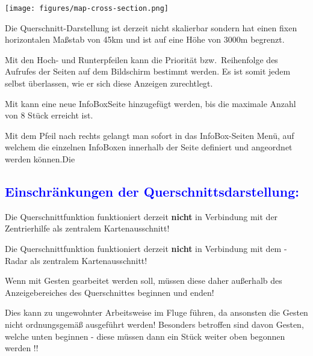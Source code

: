 \begin{center}
\hspace{7.5em}\texttt{[image: figures/map-cross-section.png]}
\end{center}

Die Querschnitt-Darstellung ist  derzeit nicht skalierbar sondern hat einen fixen horizontalen
Maßstab von 45km und ist auf eine Höhe von 3000m begrenzt.



Mit den Hoch- und Runterpfeilen kann die Priorität bzw.\ Reihenfolge des Aufrufes der Seiten
auf dem Bildschirm bestimmt werden.  Es ist somit jedem selbst überlassen, wie er sich diese
Anzeigen zurechtlegt.

Mit  kann eine neue InfoBoxSeite hinzugefügt werden, bis die maximale
Anzahl von 8 Stück erreicht ist.

Mit dem Pfeil nach rechts gelangt man sofort in das InfoBox-Seiten Menü, auf welchem die
einzelnen InfoBoxen innerhalb der Seite definiert und angeordnet  werden können.Die

 \subsection*{\textcolor{blue}{\textbf{{\large Einschränkungen der
Querschnittsdarstellung:}}}}

Die Querschnittfunktion funktioniert derzeit \textbf{nicht} in Verbindung mit der Zentrierhilfe als zentralem Kartenausschnitt!

Die Querschnittfunktion funktioniert derzeit \textbf{nicht} in Verbindung mit dem \fl-Radar als zentralem 
Kartenausschnitt!


Wenn mit Gesten gearbeitet werden soll, müssen diese daher außerhalb des
Anzeigebereiches des Querschnittes beginnen und enden!

Dies kann zu ungewohnter Arbeitsweise im Fluge führen, da ansonsten die Gesten nicht
ordnungsgemäß ausgeführt werden! Besonders betroffen sind davon Gesten, welche unten
beginnen - diese müssen dann ein Stück weiter oben begonnen werden !!

